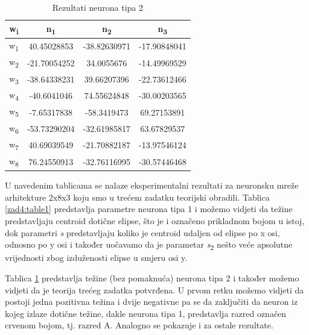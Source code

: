 \documentclass[times, utf8, seminar]{fer}
\begin{document}
\begin{table}[H]
    \centering
    \begin{tabular}{|c c c c|} 
        \hline
        w\textsubscript{i} & n\textsubscript{1} & n\textsubscript{2} & n\textsubscript{3} \\ [0.5ex] 
        \hline\hline
        \rowcolor{Red}
        w\textsubscript{1} & 40.45028853 & -38.82630971 & -17.90848041 \\
        \rowcolor{Green}
        w\textsubscript{2} & -21.70054252 & 34.0055676 & -14.49969529 \\
        \rowcolor{Green}
        w\textsubscript{3} & -38.64338231 & 39.66207396 & -22.73612466 \\
        \rowcolor{Green}
        w\textsubscript{4} & -40.6041046 & 74.55624848 & -30.00203565 \\
        \rowcolor{Blue}
        w\textsubscript{5} & -7.65317838 & -58.3419473 & 69.27153891 \\
        \rowcolor{Blue}
        w\textsubscript{6} & -53.73290204 & -32.61985817 & 63.67829537 \\
        \rowcolor{Red}
        w\textsubscript{7} & 40.69039549 & -21.70882187 & -13.97546124 \\
        \rowcolor{Red}
        w\textsubscript{8} & 76.24550913 & -32.76116995 & -30.57446468 \\ [1ex]
        \hline
    \end{tabular}
    \caption{Rezultati neurona tipa 2}
    \label{zad4:table2}
\end{table}

U navedenim tablicama se nalaze eksperimentalni rezultati za neuronsku mreže arhitekture 2x8x3 koju smo u trećem zadatku teorijski obradili. Tablica \ref{zad4:table1} predstavlja parametre neurona tipa 1 i možemo vidjeti da težine predstavljaju centroid dotične elipse, što je i označeno prikladnom bojom u istoj, dok parametri \textit{s} predstavljaju koliko je centroid udaljen od elipse po x osi, odnosno po y osi i također uočavamo da je parametar \textit{s}\textsubscript{2} nešto veće apsolutne vrijednosti zbog izduženosti elipse u smjeru osi y.

Tablica \ref{zad4:table2} predstavlja težine (bez pomaknuća) neurona tipa 2 i također možemo vidjeti da je teorija trećeg zadatka potvrđena. U prvom retku možemo vidjeti da postoji jedna pozitivna težina i dvije negativne pa se da zaključiti da neuron iz kojeg izlaze dotične težine, dakle neurona tipa 1, predstavlja razred označen crvenom bojom, tj. razred A. Analogno se pokazuje i za ostale rezultate.
\end{document}
